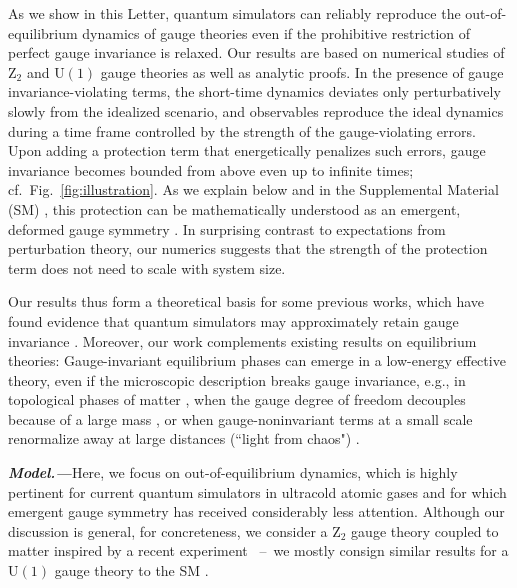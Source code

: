 \documentclass[aps,prl,reprint,twocolumn,superscriptaddress,floatfix,nofootinbib]{revtex4-1}
\begin{document}
	As we show in this Letter, quantum simulators can reliably reproduce the out-of-equilibrium dynamics of gauge theories even if the prohibitive restriction of perfect gauge invariance is relaxed. 
	Our results are based on numerical studies of $\mathrm{Z}_2$ and $\mathrm{U}(1)$ gauge theories as well as analytic proofs. 
	In the presence of gauge invariance-violating terms, the short-time dynamics deviates only perturbatively slowly from the idealized scenario, and observables reproduce the ideal dynamics during a time frame controlled by the strength of the gauge-violating errors. 
	Upon adding a protection term that energetically penalizes such errors, gauge invariance becomes bounded from above even up to infinite times; cf.~Fig.~\ref{fig:illustration}.
	As we explain below and in the Supplemental Material (SM) \cite{SM5}, this protection can be mathematically understood as an emergent, deformed gauge symmetry \cite{Chubb2017}. 
	In surprising contrast to expectations from perturbation theory, our numerics suggests that the strength of the protection term does not need to scale with system size. 
	
	
	Our results thus form a theoretical basis for some previous works, which have found evidence that quantum simulators may approximately retain gauge invariance \cite{Banerjee2012,Hauke2013,Kuehn2014,Negretti2017,Barros2019}. Moreover, our work complements existing results on equilibrium theories: 
	Gauge-invariant equilibrium phases can emerge in a low-energy effective theory, even if the microscopic description breaks gauge invariance, e.g., in topological phases of matter \cite{Hastings2005}, when the gauge degree of freedom decouples because of a large mass \cite{Wetterich2017}, or when gauge-noninvariant terms at a small scale renormalize away at large distances (``light from chaos") \cite{Foerster1980,Poppitz2008,Golterman2001}. 
	
	\textbf{\emph{Model.---}}Here, we focus on out-of-equilibrium dynamics, which is highly pertinent for current quantum simulators in ultracold atomic gases \cite{Schweizer2019,Goerg2019,Mil2019,Yang2019} and for which emergent gauge symmetry has received considerably less attention. Although our discussion is general, for concreteness, we consider a $\mathrm{Z}_2$ gauge theory \cite{Zohar2017,Barbiero2019,Frank2019,Borla2019} coupled to matter inspired by a recent experiment \cite{Schweizer2019}~--~we mostly consign similar results for a $\mathrm{U}(1)$ gauge theory to the SM \cite{SM0}. 
	
\end{document}
